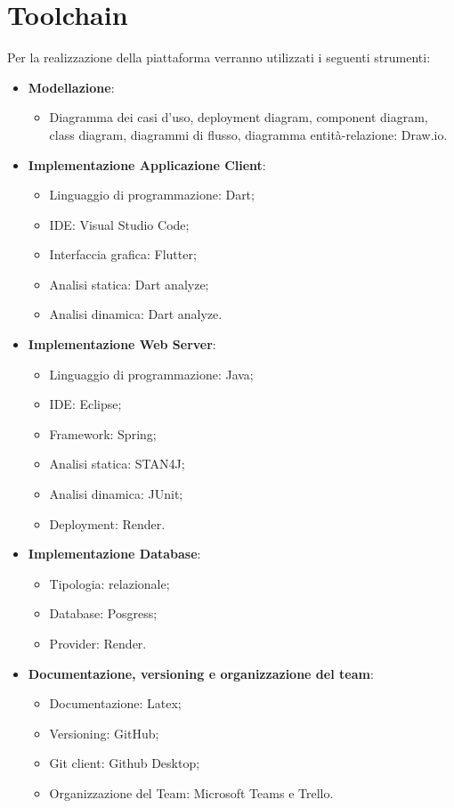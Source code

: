 \section{Toolchain}
Per la realizzazione della piattaforma verranno utilizzati i seguenti strumenti:
\begin{itemize}
	\item \textbf{Modellazione}:
	\begin{itemize}
		\item Diagramma dei casi d'uso, deployment diagram, component diagram, class
		diagram, diagrammi di flusso, diagramma entità-relazione: Draw.io.
	\end{itemize}
	\item \textbf{Implementazione Applicazione Client}:
	\begin{itemize}
		\item Linguaggio di programmazione: Dart;
		\item IDE: Visual Studio Code;
		\item Interfaccia grafica: Flutter;
		\item Analisi statica: Dart analyze;
		\item Analisi dinamica: Dart analyze.
	\end{itemize}
	\item \textbf{Implementazione Web Server}:
	\begin{itemize}
		\item Linguaggio di programmazione: Java;
		\item IDE: Eclipse;
		\item Framework: Spring;
		\item Analisi statica: STAN4J;
		\item Analisi dinamica: JUnit;
		\item Deployment: Render.
	\end{itemize}
	\item \textbf{Implementazione Database}:
	\begin{itemize}
		\item Tipologia: relazionale;
		\item Database: Posgress;
		\item Provider: Render.
	\end{itemize}
	\item \textbf{Documentazione, versioning e organizzazione del team}:
	\begin{itemize}
		\item Documentazione: Latex;
		\item Versioning: GitHub;
		\item Git client: Github Desktop;
		\item Organizzazione del Team: Microsoft Teams e Trello.
	\end{itemize}
\end{itemize}